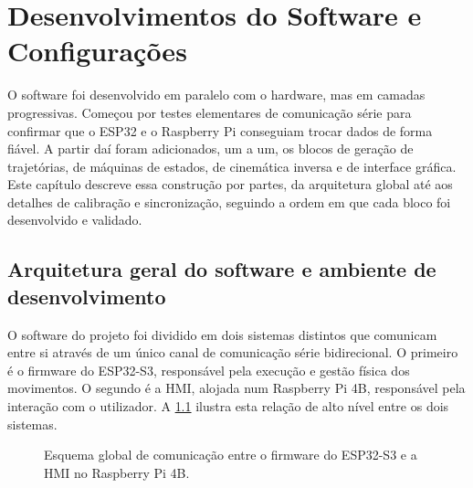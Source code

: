 ﻿\chapter{Desenvolvimentos do Software e Configurações}

O software foi desenvolvido em paralelo com o hardware, mas em camadas progressivas. Começou por testes elementares de comunicação série para confirmar que o ESP32 e o Raspberry Pi conseguiam trocar dados de forma fiável. A partir daí foram adicionados, um a um, os blocos de geração de trajetórias, de máquinas de estados, de cinemática inversa e de interface gráfica. Este capítulo descreve essa construção por partes, da arquitetura global até aos detalhes de calibração e sincronização, seguindo a ordem em que cada bloco foi desenvolvido e validado.

\section{Arquitetura geral do software e ambiente de desenvolvimento}
\label{sec:arquitetura-software-geral}
O software do projeto foi dividido em dois sistemas distintos que comunicam entre si através de um único canal de comunicação série bidirecional. O primeiro é o firmware do ESP32-S3, responsável pela execução e gestão física dos movimentos. 
O segundo é a HMI, alojada num Raspberry Pi 4B, responsável pela interação com o utilizador. 
A \cref{fig:esquema-global-software} ilustra esta relação de alto nível entre os dois sistemas.

\begin{figure}[htbp]
  \centering
  \caption{Esquema global de comunicação entre o firmware do ESP32-S3 e a HMI no Raspberry Pi 4B.}
  \label{fig:esquema-global-software}
\end{figure}

